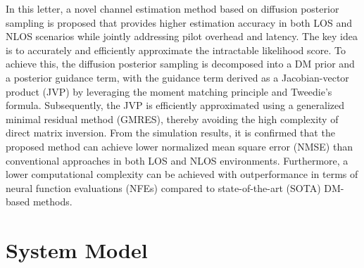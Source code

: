 \documentclass[lettersize,journal]{IEEEtran}
\begin{document}
In this letter, a novel channel estimation method based on diffusion posterior sampling is proposed that provides higher estimation accuracy in both LOS and NLOS scenarios while jointly addressing pilot overhead and latency. The key idea is to accurately and efficiently approximate the intractable likelihood score. To achieve this, the diffusion posterior sampling is decomposed into a DM prior and a posterior guidance term, with the guidance term derived as a Jacobian-vector product (JVP) by leveraging the moment matching principle and Tweedie’s formula. Subsequently, the JVP is efficiently approximated using a generalized minimal residual method (GMRES), thereby avoiding the high complexity of direct matrix inversion. From the simulation results, it is confirmed that the proposed method can achieve lower normalized mean square error (NMSE) than conventional approaches in both LOS and NLOS environments. Furthermore, a lower computational complexity can be achieved with outperformance in terms of neural function evaluations (NFEs) compared to state-of-the-art (SOTA) DM-based methods.

\section{System Model}
\end{document}
